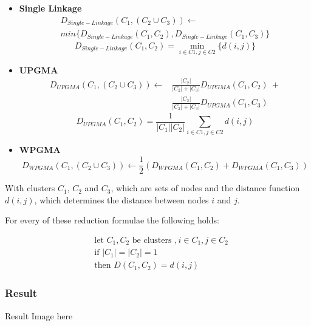 \documentclass[11pt, a4paper]{report}
\begin{document}
\begin{itemize}
    \item \textbf{Single Linkage}
    \begin{multline}
    D_{Single-Linkage}(C_1, (C_2 \cup C_3)) \leftarrow \\
    min \{ D_{Single-Linkage}(C_1, C_2), D_{Single-Linkage}(C_1, C_3) \}
    \end{multline}
    \begin{equation}
    D_{Single-Linkage}(C_1, C_2) = \min_{i\in{C1}, j\in{C2}}\{d(i, j)\}
    \end{equation}
    \item \textbf{UPGMA}
    \begin{equation}
    \begin{split}
    D_{UPGMA}(C_1, (C_2 \cup C_3)) \leftarrow &\frac{|C_2|}{|C_2|+|C_3|}D_{UPGMA}(C_1, C_2)\ + \\ &\frac{|C_3|}{|C_2|+|C_3|}D_{UPGMA}(C_1, C_3)
    \end{split}
    \end{equation}
    \begin{equation}
    D_{UPGMA}(C_1, C_2) = \dfrac{1}{|C_1||C_2|} \sum_{i\in{C1}, j\in{C2}}{d(i, j)}
    \end{equation}
    \item \textbf{WPGMA}
    \begin{equation}
    D_{WPGMA}(C_1, (C_2 \cup C_3)) \leftarrow \frac{1}{2} (D_{WPGMA}(C_1, C_2) + D_{WPGMA}(C_1, C_3))
    \end{equation}
\end{itemize}

With clusters $C_1$, $C_2$ and $C_3$, which are sets of nodes and the distance function $d(i, j)$, which determines the distance between nodes $i$ and $j$.

For every of these reduction formulae the following holds:

\begin{equation}
\begin{split}
&\textrm{let }C_1, C_2\textrm{ be clusters },i \in C_1, j \in C_2 \\
&\textrm{if }|C_1| = |C_2| = 1 \\
&\textrm{then }D(C_1, C_2) = d(i, j)
\end{split}
\end{equation}

\subsubsection{Result}
Result Image here
\end{document}
